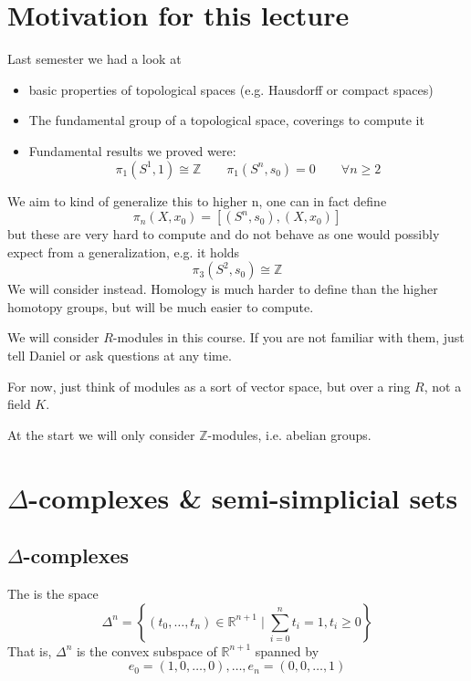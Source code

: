 \setcounter{section}{-1}
\section{Motivation for this lecture}

Last semester we had a look at
\begin{itemize}
    \item basic properties of topological spaces (e.g. Hausdorff or compact spaces)
    \item The fundamental group of a topological space, coverings to compute it
    \item Fundamental results we proved were:
        \[
            \pi_1(S^1,1)\cong \mathbb{Z} \qquad \pi_1(S^n, s_0) = 0 \qquad \forall n\geq 2
        \] 
\end{itemize}

We aim to kind of generalize this to higher n, one can in fact define
\[
    \pi_n(X,x_0) = [(S^n,s_0), (X,x_0)]
\] 
but these are very hard to compute and do not behave as one would possibly expect from a generalization, e.g. it holds
\[
    \pi_3(S^2,s_0) \cong \mathbb{Z}
\] 
We will consider  instead. Homology is much harder to define than the higher homotopy groups, but will be much easier to compute.

\begin{warning}
    We will consider $R$-modules in this course. If you are not familiar with them, just tell Daniel or ask questions at any time.
\end{warning}
For now, just think of modules as a sort of vector space, but over a ring $R$, not a field  $K$.

At the start we will only consider $\mathbb{Z}$-modules, i.e. abelian groups.


\section{$\Delta$-complexes \& semi-simplicial sets}
\subsection{$\Delta$-complexes}

\begin{definition}[simplex]\label{def:simplex}
    The  is the space
    \[
        \Delta^n = \left \{(t_0,\ldots,t_n)\in \mathbb{R}^{n+1} \mid  \sum_{i=0}^n t_i = 1, t_i \geq  0\right\} 
    \]
    That is, $\Delta^n$ is the convex subspace of  $\mathbb{R}^{n+1}$ spanned by
    \[
        e_0 =(1,0,\ldots,0), \ldots, e_n = (0,0,\ldots,1)
    \] 
\end{definition}


